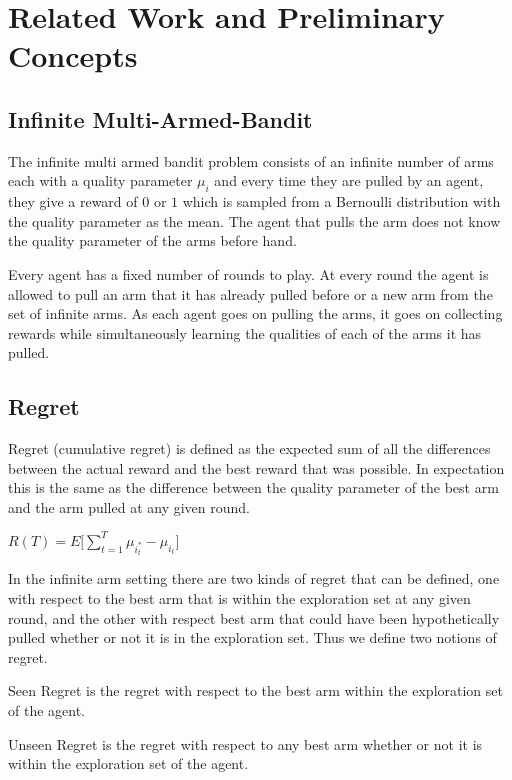 \section{Related Work and Preliminary Concepts}

\subsection{Infinite Multi-Armed-Bandit}

The infinite multi armed bandit problem consists of an infinite number of arms each with a quality parameter $\mu_i$ and every time they are pulled by an agent, they give a reward of $0$ or $1$ which is sampled from a Bernoulli distribution with the quality parameter as the mean. The agent that pulls the arm does not know the quality parameter of the arms before hand.

Every agent has a fixed number of rounds to play. At every round the agent is allowed to pull an arm that it has already pulled before or a new arm from the set of infinite arms. As each agent goes on pulling the arms, it goes on collecting rewards while simultaneously learning the qualities of each of the arms it has pulled.

\subsection{Regret}

Regret (cumulative regret) is defined as the expected sum of all the differences between the actual reward and the best reward that was possible. In expectation this is the same as the difference between the quality parameter of the best arm and the arm pulled at any given round.

$R(T) = E\lbrack  \sum^{T}_{t=1} \mu_{i_t^*} - \mu_{i_t}\rbrack$

In the infinite arm setting there are two kinds of regret that can be defined, one with respect to the best arm that is within the exploration set at any given round, and the other with respect best arm that could have been hypothetically pulled whether or not it is in the exploration set. Thus we define two notions of regret.


\begin{definition}
    Seen Regret is the regret with respect to the best arm within the exploration set of the agent.
\end{definition}

\begin{definition}
    Unseen Regret is the regret with respect to any best arm whether or not it is within the exploration set of the agent.
\end{definition}

